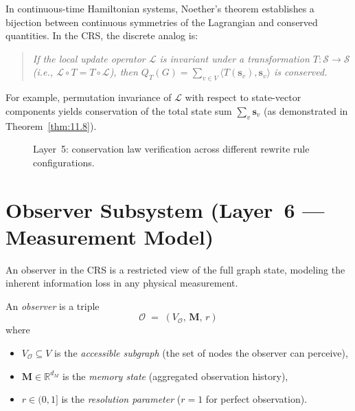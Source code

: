 \begin{remark}
\label{rem:11.2}
In continuous-time Hamiltonian systems, Noether's theorem establishes
a bijection between continuous symmetries of the Lagrangian and
conserved quantities.  In the CRS, the discrete analog is:
\begin{quote}
  \emph{If the local update operator $\mathcal{L}$ is invariant under
  a transformation $T \colon \mathcal{S} \to \mathcal{S}$
  (i.e., $\mathcal{L} \circ T = T \circ \mathcal{L}$), then
  $Q_T(G) = \sum_{v \in V} \langle T(\mathbf{s}_v),
  \mathbf{s}_v \rangle$ is conserved.}
\end{quote}
For example, permutation invariance of $\mathcal{L}$ with respect to
state-vector components yields conservation of the total state sum
$\sum_v \mathbf{s}_v$ (as demonstrated in Theorem~\ref{thm:11.8}).
\end{remark}

\begin{figure}[t]
\centering
{}
\caption{Layer~5: conservation law verification across different
  rewrite rule configurations.}
\label{fig:c11:conservation}
\end{figure}

\section{Observer Subsystem (Layer~6 --- Measurement Model)}
\label{sec:ch11:observer}

An observer in the CRS is a restricted view of the full graph state,
modeling the inherent information loss in any physical measurement.

\begin{definition}[Observer]
\label{def:11.31}
An \emph{observer} is a triple
\[
  \mathcal{O} \;=\; (V_{\mathcal{O}},\, \mathbf{M},\, r)
\]
where
\begin{itemize}
  \item $V_{\mathcal{O}} \subseteq V$ is the \emph{accessible
        subgraph} (the set of nodes the observer can perceive),
  \item $\mathbf{M} \in \mathbb{R}^{d_M}$ is the \emph{memory state}
        (aggregated observation history),
  \item $r \in (0, 1]$ is the \emph{resolution parameter}
        ($r = 1$ for perfect observation).
\end{itemize}
\end{definition}

